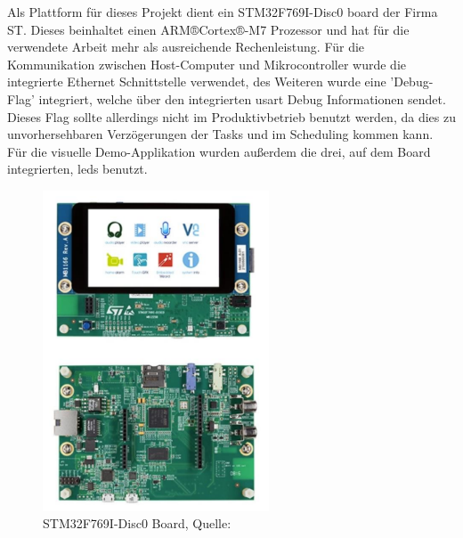 \documentclass[../EDF Master Thesis.tex]{subfiles}
\begin{document}
Als Plattform für dieses Projekt dient ein STM32F769I-Disc0 board der Firma ST.
Dieses beinhaltet einen ARM®Cortex®-M7 Prozessor und hat für die verwendete Arbeit mehr als ausreichende Rechenleistung.
Für die Kommunikation zwischen Host-Computer und Mikrocontroller wurde die integrierte Ethernet Schnittstelle verwendet, des Weiteren wurde eine 'Debug-Flag' integriert, welche über den integrierten \ac{usart} Debug Informationen sendet.
Dieses Flag sollte allerdings nicht im Produktivbetrieb benutzt werden, da dies zu unvorhersehbaren Verzögerungen der Tasks und im Scheduling kommen kann.
Für die visuelle Demo-Applikation wurden außerdem die drei, auf dem Board integrierten, \ac{led}s benutzt.

\begin{figure}[ht!]
    \begin{center}
        \includegraphics[width=0.6\textwidth]{attachments/stm32f769i-disc0.pdf}
    \end{center}
    \caption{STM32F769I-Disc0 Board, Quelle: \autocite{stm:001}}
    \label{fig:STM32F769I-Disc0_board}
\end{figure}
\end{document}
